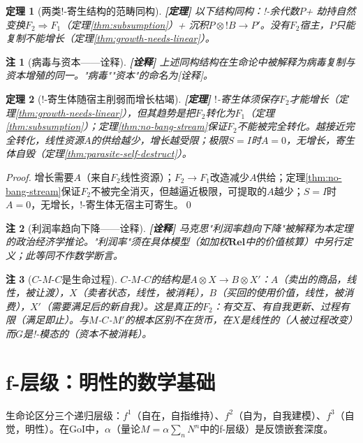 \documentclass[11pt,a4paper]{article}
\newtheorem{theorem}{定理}
\newtheorem{remark}{注}
\newcommand{\lvl}[1]{\hfill\textbf{\footnotesize[#1]}}
\newcommand{\lvP}{\lvl{定理}}
\newcommand{\lvI}{\lvl{诠释}}
\newcommand{\bang}{{!}}
\newcommand{\tensor}{\otimes}
\begin{document}
\begin{theorem}[两类!-寄生结构的范畴同构]\label{thm:virus-capital}\lvP
以下结构同构：!-余代数$P$+ 劫持自然变换$F_2\Rightarrow F_1$（定理\ref{thm:subsumption}）+ 沉积$P\tensor\bang B\to P'$。没有$F_2$宿主，$P$只能复制不能增长（定理\ref{thm:growth-needs-linear}）。
\end{theorem}

\begin{remark}[病毒与资本——诠释]\lvI
上述同构结构在生命论中被解释为病毒复制与资本增殖的同一。"病毒""资本"的命名为[诠释]。
\end{remark}

\begin{theorem}[!-寄生体随宿主削弱而增长枯竭]\label{thm:capital-contradiction}\lvP
$\bang$-寄生体须保存$F_2$才能增长（定理\ref{thm:growth-needs-linear}），但其趋势是把$F_2$转化为$F_1$（定理\ref{thm:subsumption}）；定理\ref{thm:no-bang-stream}保证$F_2$不能被完全转化。越接近完全转化，线性资源$A$的供给越少，增长越受限；极限$S=I$时$A=0$，无增长，寄生体自毁（定理\ref{thm:parasite-self-destruct}）。
\end{theorem}

\begin{proof}
增长需要$A$（来自$F_2$线性资源）；$F_2\to F_1$改造减少$A$供给；定理\ref{thm:no-bang-stream}保证$F_2$不被完全消灭，但越逼近极限，可提取的$A$越少；$S=I$时$A=0$，无增长，$\bang$-寄生体无宿主可寄生。\qed
\end{proof}

\begin{remark}[利润率趋向下降——诠释]\lvI
马克思"利润率趋向下降"被解释为本定理的政治经济学推论。"利润率"须在具体模型（如加权$\mathbf{Rel}$中的价值核算）中另行定义；此等同不作数学断言。
\end{remark}

\begin{remark}[$C$-$M$-$C$是生命过程]
$C$-$M$-$C$的结构是$A\tensor X\to B\tensor X'$：$A$（卖出的商品，线性，被让渡），$X$（卖者状态，线性，被消耗），$B$（买回的使用价值，线性，被消费），$X'$（需要满足后的新自我）。这是真正的$F_2$：有交互、有自我更新、过程有限（满足即止）。与$M$-$C$-$M'$的根本区别不在货币，在$X$是线性的（人被过程改变）而$G$是!-模态的（资本不被消耗）。
\end{remark}

\section{f-层级：明性的数学基础}

生命论区分三个递归层级：$f^1$（自在，自指维持）、$f^2$（自为，自我建模）、$f^3$（自觉，明性）。在GoI中，$\alpha$（量论$M=\alpha\sum_n N^n$中的f-层级）是反馈嵌套深度。
\end{document}
